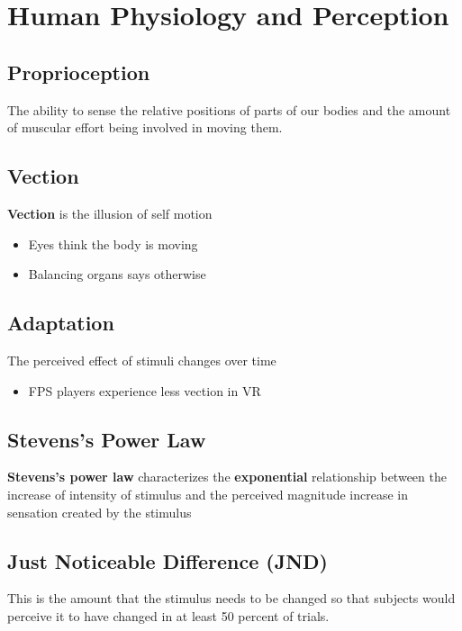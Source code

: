 \chapter{Human Physiology and Perception}

\section{Proprioception}

  The ability to sense the relative positions of parts of our bodies and
  the amount of muscular effort being involved in moving them.

\section{Vection}

  \textbf{Vection} is the illusion of self motion

  \begin{itemize}
    \item Eyes think the body is moving
    \item Balancing organs says otherwise
  \end{itemize}

\section{Adaptation}

  The perceived effect of stimuli changes over time

  \begin{itemize}
    \item FPS players experience less vection in VR
  \end{itemize}

\section{Stevens's Power Law}

  \textbf{Stevens's power law} characterizes the \textbf{exponential} relationship
  between the increase of intensity of stimulus and the perceived magnitude
  increase in sensation created by the stimulus

\section{Just Noticeable Difference (JND)}

  This is the amount that the stimulus needs to be changed so that subjects
  would perceive it to have changed in at least 50 percent of trials.

